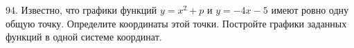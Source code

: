 94. Известно, что графики функций $y=x^2+p$ и $y=-4x-5$ имеют ровно одну общую точку. Определите координаты этой точки. Постройте графики заданных функций в одной системе координат.\\
